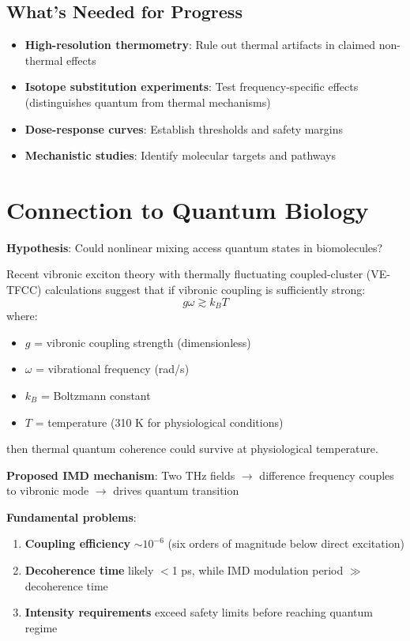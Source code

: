 \subsection*{What's Needed for Progress}
\begin{itemize}
\item \textbf{High-resolution thermometry}: Rule out thermal artifacts in claimed non-thermal effects
\item \textbf{Isotope substitution experiments}: Test frequency-specific effects (distinguishes quantum from thermal mechanisms)
\item \textbf{Dose-response curves}: Establish thresholds and safety margins
\item \textbf{Mechanistic studies}: Identify molecular targets and pathways
\end{itemize}

\section{Connection to Quantum Biology}

\textbf{Hypothesis}: Could nonlinear mixing access quantum states in biomolecules?

Recent vibronic exciton theory with thermally fluctuating coupled-cluster (VE-TFCC) calculations suggest that if vibronic coupling is sufficiently strong:
\begin{equation}
\label{eq:vibronic-condition}
g\omega \gtrsim k_B T
\end{equation}
where:
\begin{itemize}
\item $g$ = vibronic coupling strength (dimensionless)
\item $\omega$ = vibrational frequency (rad/s)
\item $k_B$ = Boltzmann constant
\item $T$ = temperature (310 K for physiological conditions)
\end{itemize}
then thermal quantum coherence could survive at physiological temperature.

\textbf{Proposed IMD mechanism}: Two THz fields $\rightarrow$ difference frequency couples to vibronic mode $\rightarrow$ drives quantum transition

\textbf{Fundamental problems}:
\begin{enumerate}
\item \textbf{Coupling efficiency} $\sim 10^{-6}$ (six orders of magnitude below direct excitation)
\item \textbf{Decoherence time} likely $<$1 ps, while IMD modulation period $\gg$ decoherence time
\item \textbf{Intensity requirements} exceed safety limits before reaching quantum regime
\end{enumerate}

